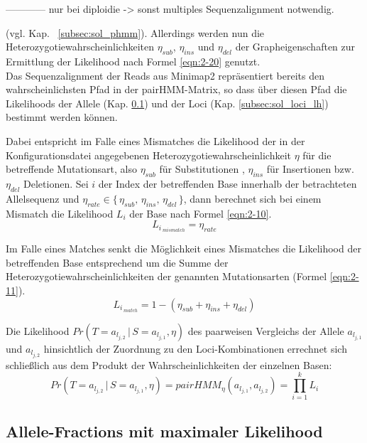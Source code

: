 ------------
nur bei diploidie -> sonst multiples Sequenzalignment notwendig.

(vgl. Kap. ~\ref{subsec:sol_phmm}). Allerdings werden nun die Heterozygotiewahrscheinlichkeiten $\eta_{sub}$, $\eta_{ins}$ und $\eta_{del}$ der Grapheigenschaften zur Ermittlung der Likelihood nach Formel \eqref{eqn:2-20} genutzt.  \\

Das Sequenzalignment der Reads aus Minimap2 repräsentiert bereits den wahrscheinlichsten Pfad in der pairHMM-Matrix, so dass über diesen Pfad die Likelihoods der Allele (Kap. \ref{subsec:sol_allele_lh}) und der Loci (Kap. \ref{subsec:sol_loci_lh}) bestimmt werden können.

Dabei entspricht im Falle eines Mismatches die Likelihood der in der Konfigurationsdatei angegebenen Heterozygotiewahrscheinlichkeit $ \eta $ für die betreffende Mutationsart, also $ \eta_{sub} $ für Substitutionen , $ \eta_{ins} $ für Insertionen bzw. $ \eta_{del} $ Deletionen. Sei $i$ der Index der betreffenden Base innerhalb der betrachteten Allelsequenz und $ \eta_{rate} \in \{\,\eta_{sub},\, \eta_{ins},\, \eta_{del}\,\}$, dann berechnet sich bei einem Mismatch die Likelihood $L_{i}$ der Base nach Formel \eqref{eqn:2-10}.
\begin{equation} \label{eqn:2-10}
\tag{2-10}
L_{i\,_{mismatch}} = \eta_{rate}
\end{equation}

Im Falle eines Matches senkt die Möglichkeit eines Mismatches die Likelihood der betreffenden Base entsprechend um die Summe der Heterozygotiewahrscheinlichkeiten der genannten Mutationsarten (Formel \eqref{eqn:2-11}).
\begin{equation} \label{eqn:2-11}
\tag{2-11}
L_{i\,_{match}} = 1 - (\eta_{sub} + \eta_{ins} + \eta_{del})
\end{equation}

Die Likelihood $ Pr(T=a_{l_{j,2}} \, | \, S=a_{l_{j,1}}, \eta) $ des paarweisen Vergleichs der Allele $a_{l_{j,1}}$ und $a_{l_{j,2}}$ hinsichtlich der Zuordnung zu den Loci-Kombinationen errechnet sich schließlich aus dem Produkt der Wahrscheinlichkeiten der einzelnen Basen:
\begin{equation} \label{eqn:2-12}
\tag{2-12}
Pr(T=a_{l_{j,2}} \, | \, S=a_{l_{j,1}}, \eta) = pairHMM_{\eta}(a_{l_{j,1}}, a_{l_{j,2}}) = \prod_{i=1}^{k}L_{i}
\end{equation}

\subsection{Allele-Fractions mit maximaler Likelihood} \label{subsec:sol_allele_lh}

